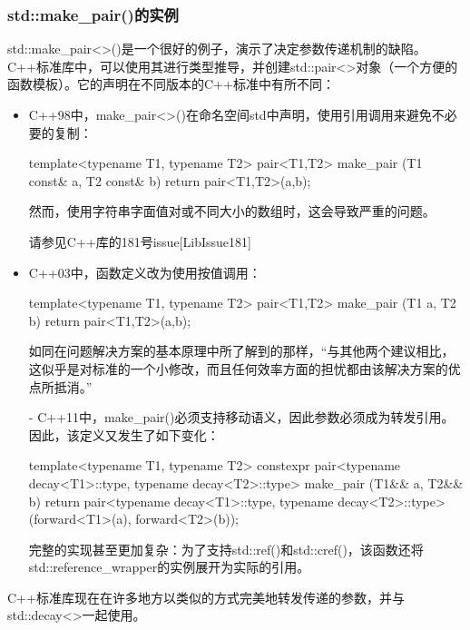\subsubsection{std::make\_pair()的实例}

std::make\_pair<>()是一个很好的例子，演示了决定参数传递机制的缺陷。C++标准库中，可以使用其进行类型推导，并创建std::pair<>对象（一个方便的函数模板）。它的声明在不同版本的C++标准中有所不同：

\begin{itemize}
\item
C++98中，make\_pair<>()在命名空间std中声明，使用引用调用来避免不必要的复制：

\begin{cpp}
template<typename T1, typename T2>
pair<T1,T2> make_pair (T1 const& a, T2 const& b) {
	return pair<T1,T2>(a,b);
}
\end{cpp}

然而，使用字符串字面值对或不同大小的数组时，这会导致严重的问题。

\begin{notice}
请参见C++库的181号issue[LibIssue181]
\end{notice}

\item
C++03中，函数定义改为使用按值调用：

\begin{cpp}
template<typename T1, typename T2>
pair<T1,T2> make_pair (T1 a, T2 b) {
	return pair<T1,T2>(a,b);
}
\end{cpp}

如同在问题解决方案的基本原理中所了解到的那样，“与其他两个建议相比，这似乎是对标准的一个小修改，而且任何效率方面的担忧都由该解决方案的优点所抵消。”

\item[-]
C++11中，make\_pair()必须支持移动语义，因此参数必须成为转发引用。因此，该定义又发生了如下变化：

\begin{cpp}
template<typename T1, typename T2>
constexpr pair<typename decay<T1>::type, typename decay<T2>::type>
make_pair (T1&& a, T2&& b) {
	return pair<typename decay<T1>::type,
				typename decay<T2>::type>(forward<T1>(a),
										  forward<T2>(b));
}
\end{cpp}

完整的实现甚至更加复杂：为了支持std::ref()和std::cref()，该函数还将std::reference\_wrapper的实例展开为实际的引用。
\end{itemize}

C++标准库现在在许多地方以类似的方式完美地转发传递的参数，并与std::decay<>一起使用。


















